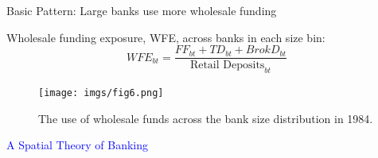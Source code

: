 \documentclass[notes,10pt, aspectratio=169]{beamer}
\begin{document}
    \begin{frame}{Basic Pattern: Large banks use more wholesale funding}

Wholesale funding exposure, WFE, across banks in each size bin:
        $$WFE_{bt} = \frac{FF_{bt} + TD_{bt} + BrokD_{bt}}{\text{Retail Deposits}_{bt}}$$
        
        \begin{figure}
            \centering
            \texttt{[image: imgs/fig6.png]}
            \caption*{ The use of wholesale funds across the bank size distribution in 1984.}
            \label{fig:my_label}
        \end{figure}
        
        \end{frame}


\begin{frame}[noframenumbering]

\huge \centering \textcolor{blue}{A Spatial Theory of Banking}

\end{frame}
    
\end{document}
